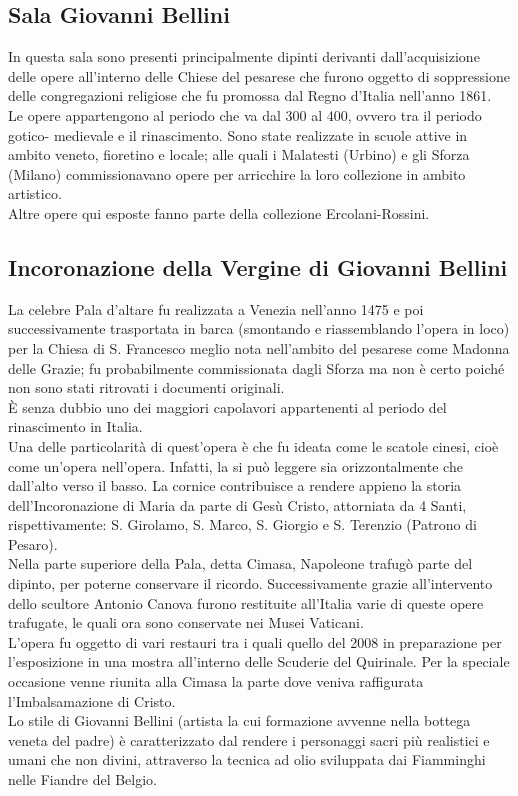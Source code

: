 \documentclass[hidelinks,12pt,a4paper]{article}
\begin{document}
\begin{flushleft}
		\section{Sala Giovanni Bellini}
		In questa sala sono presenti principalmente dipinti derivanti dall'acquisizione delle opere all'interno delle Chiese del pesarese che furono oggetto di soppressione delle congregazioni religiose che fu promossa dal Regno d'Italia nell'anno 1861.\\
		Le opere appartengono al periodo che va dal  300 al 400, ovvero tra il periodo gotico- medievale e il rinascimento. Sono state realizzate in scuole attive in ambito veneto, fioretino e locale; alle quali i Malatesti (Urbino) e gli Sforza (Milano) commissionavano opere per arricchire la loro collezione in ambito artistico.\\
		Altre opere qui esposte fanno parte della collezione Ercolani-Rossini.
		
		\subsection{Incoronazione della Vergine di Giovanni Bellini}
		La celebre Pala d'altare fu realizzata a Venezia nell'anno 1475 e poi successivamente trasportata in barca (smontando e riassemblando l'opera in loco) per la Chiesa di S. Francesco meglio nota nell'ambito del pesarese come Madonna delle Grazie; fu probabilmente commissionata dagli Sforza ma non è certo poiché non sono stati ritrovati i documenti originali.\\
		È senza dubbio uno dei maggiori capolavori appartenenti al periodo del rinascimento in Italia.\\
		Una delle particolarità di quest'opera è che fu ideata come le scatole cinesi, cioè come un’opera nell'opera. Infatti, la si può leggere sia orizzontalmente che dall'alto verso il basso. La cornice contribuisce a rendere appieno la storia dell'Incoronazione di Maria da parte di Gesù Cristo, attorniata da 4 Santi, rispettivamente: S. Girolamo, S. Marco, S. Giorgio e S. Terenzio (Patrono di Pesaro). \\
		Nella parte superiore della Pala, detta Cimasa, Napoleone trafugò parte del dipinto, per poterne conservare il ricordo. Successivamente grazie all'intervento dello scultore Antonio Canova furono restituite all'Italia varie di queste opere trafugate, le quali ora sono conservate nei Musei Vaticani.\\
		L'opera fu oggetto di vari restauri tra i quali quello del 2008 in preparazione per l'esposizione in una mostra all'interno delle Scuderie del Quirinale. Per la speciale occasione venne riunita alla Cimasa la parte dove veniva raffigurata l’Imbalsamazione di Cristo.\\
		Lo stile di Giovanni Bellini (artista la cui formazione avvenne nella bottega veneta del padre)  è caratterizzato dal rendere i personaggi sacri più realistici e umani che non divini, attraverso la tecnica ad olio sviluppata dai Fiamminghi nelle Fiandre del Belgio.
		

\end{flushleft}
\end{document}
